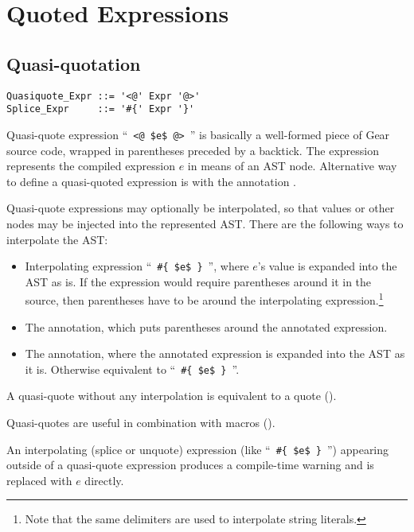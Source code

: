 \section{Quoted Expressions}
\label{sec:syntactic-forms}






\subsection{Quasi-quotation}
\label{sec:quasi-quotation}

\syntax\begin{lstlisting}
Quasiquote_Expr ::= '<@' Expr '@>'
Splice_Expr     ::= '#{' Expr '}'
\end{lstlisting}

Quasi-quote expression ``~\lstinline!<@ $e$ @>!~'' is basically a well-formed piece of Gear source code, wrapped in parentheses preceded by a backtick. The expression represents the compiled expression $e$ in means of an AST node. Alternative way to define a quasi-quoted expression is with the annotation .

Quasi-quote expressions may optionally be interpolated, so that values or other nodes may be injected into the represented AST. There are the following ways to interpolate the AST:
\begin{itemize}
  \item Interpolating expression ``~\lstinline!#{ $e$ }!~'', where $e$'s value is expanded into the AST as is. If the expression would require parentheses around it in the source, then parentheses have to be around the interpolating expression.\footnote{Note that the same delimiters are used to interpolate string literals.}
  \item The  annotation, which puts parentheses around the annotated expression.
  \item The  annotation, where the annotated expression is expanded into the AST as it is. Otherwise equivalent to ``~\lstinline!#{ $e$ }!~''.
\end{itemize}

A quasi-quote without any interpolation is equivalent to a quote (). 

Quasi-quotes are useful in combination with macros (). 

An interpolating (splice or unquote) expression (like ``~\lstinline!#{ $e$ }!~'') appearing outside of a quasi-quote expression produces a compile-time warning and is replaced with $e$ directly. 





